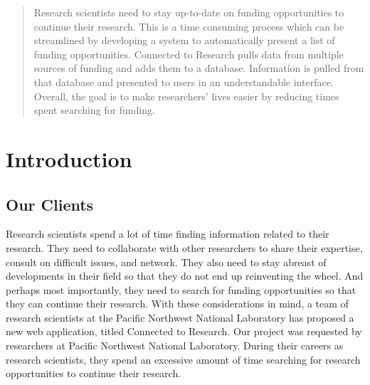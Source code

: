 \documentclass[onecolumn]{IEEEtran}
\begin{document}
\begin{titlepage}
    \begin{minipage}{1.0\textwidth}
        \begin{abstract}
            Research scientists need to stay up-to-date on funding opportunities to continue their research. This is a time consuming process which can be streamlined by developing a system to automatically present a list of funding opportunities. Connected to Research pulls data from multiple sources of funding and adds them to a database. Information is pulled from that database and presented to users in an understandable interface. Overall, the goal is to make researchers' lives easier by reducing times spent searching for funding.
        \end{abstract}
    \end{minipage}

\end{titlepage}

\tableofcontents
\pagebreak	%

\setcounter{page}{1}

\section{Introduction}

\subsection{Our Clients}
Research scientists spend a lot of time finding information related to their research. They need to collaborate with other researchers to share their expertise, consult on difficult issues, and network. They also need to stay abreast of developments in their field so that they do not end up reinventing the wheel. And perhaps most importantly, they need to search for funding opportunities so that they can continue their research. With these considerations in mind, a team of research scientists at the Pacific Northwest National Laboratory has proposed a new web application, titled Connected to Research.  
Our project was requested by researchers at Pacific Northwest National Laboratory.  During their careers as research scientists, they spend an excessive amount of time searching for research opportunities to continue their research. 
\end{document}

